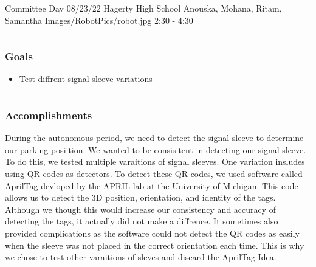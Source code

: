 \insertmeeting 
	{Committee Day} 
	{08/23/22}
	{Hagerty High School}
	{Anouska, Mohana, Ritam, Samantha}
	{Images/RobotPics/robot.jpg}
	{2:30 - 4:30}
	
\noindent\hfil\rule{\textwidth}{.4pt}\hfil
\subsubsection*{Goals}
\begin{itemize}
    \item Test diffrent signal sleeve variations

\end{itemize} 

\noindent\hfil\rule{\textwidth}{.4pt}\hfil

\subsubsection*{Accomplishments}
During the autonomous period, we need to detect the signal sleeve to determine our parking posiition. We wanted to be consisitent in detecting our signal sleeve. To do this, we tested multiple varaitions of signal sleeves. One variation insludes using QR codes as detectors. To detect these QR codes, we used software called AprilTag devloped by the APRIL lab at the University of Michigan. This code allows us to detect the 3D position, orientation, and identity of the tags. Although we though this would increase our consistency and accuracy of detecting the tags, it actually did not make a diffrence. It sometimes also provided complications as the software could not detect the QR codes as easily when the sleeve was not placed in the correct orientation each time. This is why we chose to test other varaitions of sleves and discard the AprilTag Idea. 

